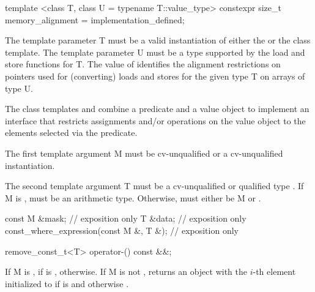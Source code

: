 \begin{itemdecl}
template <class T, class U = typename T::value_type>
constexpr size_t memory_alignment = implementation_defined;
\end{itemdecl}
\begin{itemdescr}
  \pnum\requires The template parameter \type T must be a valid instantiation of either the \datapar or the \mask class template.
  \pnum\requires The template parameter \type U must be a type supported by the load and store functions for \type T.
  \pnum The value of  identifies the alignment restrictions on pointers used for (converting) loads and stores for the given type \type T on arrays of type \type U.
\end{itemdescr}

\pnum The class templates  and  combine a predicate and a value object to implement an interface that restricts assignments and/or operations on the value object to the elements selected via the predicate.

\pnum The first template argument \type M must be cv-unqualified \bool or a cv-unqualified \mask instantiation.

\pnum The second template argument \type T must be a cv-unqualified or \const qualified type .
If \type M is \bool,  must be an arithmetic type.
Otherwise,  must either be \type M or .

\begin{itemdecl}
const M &mask;                           // exposition only
T &data;                                 // exposition only
const_where_expression(const M &, T &);  // exposition only
\end{itemdecl}
\begin{itemdescr}
  \pnum{}

  \pnum{}
\end{itemdescr}

\begin{itemdecl}
remove_const_t<T> operator-() const &&;
\end{itemdecl}
\begin{itemdescr}
  \pnum\returns If \type M is \bool,  if  is \true,  otherwise.
  If \type M is not \bool, returns an object with the $i$-th element initialized to  if  is \true and  otherwise \foralli[M::].
\end{itemdescr}

